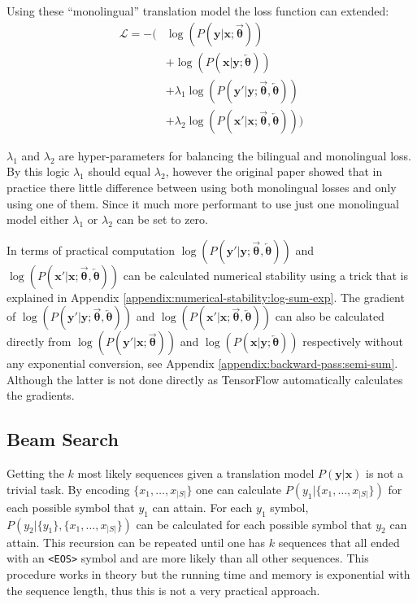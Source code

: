 Using these ``monolingual'' translation model the loss function can extended:
\begin{equation}
\begin{aligned}
\mathcal{L} = -\big(&\log(P(\mathbf{y}|\mathbf{x};\overrightarrow{\boldsymbol\theta})) \\
    &+ \log(P(\mathbf{x}|\mathbf{y};\overleftarrow{\boldsymbol\theta})) \\
    &+ \lambda_1 \log(P(\mathbf{y'}|\mathbf{y};\overrightarrow{\boldsymbol\theta},\overleftarrow{\boldsymbol\theta})) \\
    &+ \lambda_2 \log(P(\mathbf{x'}|\mathbf{x};\overrightarrow{\boldsymbol\theta},\overleftarrow{\boldsymbol\theta})) \big)
\end{aligned}
\end{equation}

$\lambda_1$ and $\lambda_2$ are hyper-parameters for balancing the bilingual and monolingual loss. By this logic $\lambda_1$ should equal $\lambda_2$, however the original paper \cite{semi-nmt} showed that in practice there little difference between using both monolingual losses and only using one of them. Since it much more performant to use just one monolingual model either $\lambda_1$ or $\lambda_2$ can be set to zero.

In terms of practical computation $\log(P(\mathbf{y'}|\mathbf{y};\overrightarrow{\boldsymbol\theta},\overleftarrow{\boldsymbol\theta}))$ and $\log(P(\mathbf{x'}|\mathbf{x};\overrightarrow{\boldsymbol\theta},\overleftarrow{\boldsymbol\theta}))$ can be calculated numerical stability using a trick that is explained in Appendix \ref{appendix:numerical-stability:log-sum-exp}. The gradient of $\log(P(\mathbf{y'}|\mathbf{y};\overrightarrow{\boldsymbol\theta},\overleftarrow{\boldsymbol\theta}))$ and $\log(P(\mathbf{x'}|\mathbf{x};\overrightarrow{\boldsymbol\theta},\overleftarrow{\boldsymbol\theta}))$ can also be calculated directly from $\log(P(\mathbf{y'}|\mathbf{x};\overrightarrow{\boldsymbol\theta}))$ and $\log(P(\mathbf{x}|\mathbf{y};\overleftarrow{\boldsymbol\theta}))$ respectively without any exponential conversion, see Appendix \ref{appendix:backward-pass:semi-sum}. Although the latter is not done directly as TensorFlow automatically calculates the gradients.

\subsection{Beam Search}

Getting the $k$ most likely sequences given a translation model $P(\mathbf{y}|\mathbf{x})$ is not a trivial task. By encoding $\{x_1, \dots, x_{|S|}\}$ one can calculate $P(y_1| \{x_1, \dots, x_{|S|}\})$ for each possible symbol that $y_1$ can attain. For each $y_1$ symbol, $P(y_2| \{y_1\}, \{x_1, \dots, x_{|S|}\})$ can be calculated for each possible symbol that $y_2$ can attain. This recursion can be repeated until one has $k$ sequences that all ended with an \texttt{<EOS>} symbol and are more likely than all other sequences. This procedure works in theory but the running time and memory is exponential with the sequence length, thus this is not a very practical approach.


